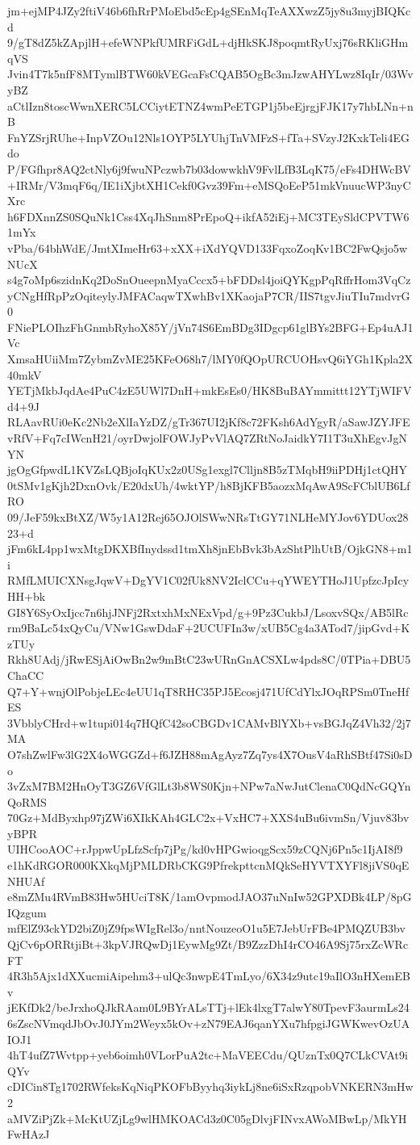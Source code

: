 jm+ejMP4JZy2ftiV46b6fhRrPMoEbd5cEp4gSEnMqTeAXXwzZ5jy8u3myjBIQKcd
9/gT8dZ5kZApjlH+efeWNPkfUMRFiGdL+djHkSKJ8poqmtRyUxj76sRKliGHmqVS
Jvin4T7k5nfF8MTymlBTW60kVEGcaFsCQAB5OgBc3mJzwAHYLwz8IqIr/03WvyBZ
aCtlIzn8toscWwnXERC5LCCiytETNZ4wmPeETGP1j5beEjrgjFJK17y7hbLNn+nB
FnYZSrjRUhe+InpVZOu12Nls1OYP5LYUhjTnVMFzS+fTa+SVzyJ2KxkTeli4EGdo
P/FGfhpr8AQ2ctNly6j9fwuNPczwb7b03dowwkhV9FvlLfB3LqK75/eFs4DHWcBV
+IRMr/V3mqF6q/IE1iXjbtXH1Cekf0Gvz39Fm+eMSQoEeP51mkVnuucWP3nyCXrc
h6FDXnnZS0SQuNk1Css4XqJhSnm8PrEpoQ+ikfA52iEj+MC3TEySldCPVTW61mYx
vPba/64bhWdE/JmtXImeHr63+xXX+iXdYQVD133FqxoZoqKv1BC2FwQsjo5wNUcX
s4g7oMp6szidnKq2DoSnOueepnMyaCccx5+bFDDsl4joiQYKgpPqRffrHom3VqCz
yCNgHfRpPzOqiteylyJMFACaqwTXwhBv1XKaojaP7CR/IIS7tgvJiuTIu7mdvrG0
FNiePLOIhzFhGnmbRyhoX85Y/jVn74S6EmBDg3IDgcp61glBYs2BFG+Ep4uAJ1Vc
XmsaHUiiMm7ZybmZvME25KFeO68h7/lMY0fQOpURCUOHsvQ6iYGh1Kpla2X40mkV
YETjMkbJqdAe4PuC4zE5UWl7DnH+mkEsEs0/HK8BuBAYmmittt12YTjWIFVd4+9J
RLAavRUi0eKc2Nb2eXlIaYzDZ/gTr367UI2jKf8c72FKsh6AdYgyR/aSawJZYJFE
vRfV+Fq7cIWcnH21/oyrDwjolFOWJyPvVlAQ7ZRtNoJaidkY7I1T3uXhEgvJgNYN
jgOgGfpwdL1KVZsLQBjoIqKUx2z0USg1exgl7Clljn8B5zTMqbH9iiPDHj1ctQHY
0tSMv1gKjh2DxnOvk/E20dxUh/4wktYP/h8BjKFB5aozxMqAwA9ScFCblUB6LfRO
09/JeF59kxBtXZ/W5y1A12Rej65OJOlSWwNRsTtGY71NLHeMYJov6YDUox2823+d
jFm6kL4pp1wxMtgDKXBfInydssd1tmXh8jnEbBvk3bAzShtPlhUtB/OjkGN8+m1i
RMfLMUICXNsgJqwV+DgYV1C02fUk8NV2IclCCu+qYWEYTHoJ1UpfzcJpIcyHH+bk
GI8Y6SyOxIjcc7n6hjJNFj2RxtxhMxNExVpd/g+9Pz3CukbJ/LsoxvSQx/AB5lRc
rm9BaLc54xQyCu/VNw1GswDdaF+2UCUFIn3w/xUB5Cg4a3ATod7/jipGvd+KzTUy
Rkh8UAdj/jRwESjAiOwBn2w9mBtC23wURnGnACSXLw4pds8C/0TPia+DBU5ChaCC
Q7+Y+wnjOlPobjeLEc4eUU1qT8RHC35PJ5Ecosj471UfCdYlxJOqRPSm0TneHfES
3VbblyCHrd+w1tupi014q7HQfC42soCBGDv1CAMvBlYXb+vsBGJqZ4Vh32/2j7MA
O7shZwlFw3lG2X4oWGGZd+f6JZH88mAgAyz7Zq7ys4X7OusV4aRhSBtf47Si0sDo
3vZxM7BM2HnOyT3GZ6VfGlLt3b8WS0Kjn+NPw7aNwJutClenaC0QdNcGQYnQoRMS
70Gz+MdByxhp97jZWi6XIkKAh4GLC2x+VxHC7+XXS4uBu6ivmSn/Vjuv83bvyBPR
UIHCooAOC+rJppwUpLfzScfp7jPg/kd0vHPGwioqgScx59zCQNj6Pn5c1IjAI8f9
e1hKdRGOR000KXkqMjPMLDRbCKG9PfrekpttcnMQkSeHYVTXYFl8jiVS0qENHUAf
e8mZMu4RVmB83Hw5HUciT8K/1amOvpmodJAO37uNnIw52GPXDBk4LP/8pGIQzgum
mfElZ93ckYD2biZ0jZ9fpsWIgRel3o/nntNouzeoO1u5E7JebUrFBe4PMQZUB3bv
QjCv6pORRtjiBt+3kpVJRQwDj1EywMg9Zt/B9ZzzDhI4rCO46A9Sj75rxZcWRcFT
4R3h5Ajx1dXXucmiAipehm3+ulQc3nwpE4TmLyo/6X34z9utc19aIlO3nHXemEBv
jEKfDk2/beJrxhoQJkRAam0L9BYrALsTTj+lEk4lxgT7alwY80TpevF3aurmLs24
6sZscNVmqdJbOvJ0JYm2Weyx5kOv+zN79EAJ6qanYXu7hfpgiJGWKwevOzUAIOJ1
4hT4ufZ7Wvtpp+yeb6oimh0VLorPuA2tc+MaVEECdu/QUznTx0Q7CLkCVAt9iQYv
cDICin8Tg1702RWfeksKqNiqPKOFbByyhq3iykLj8ne6iSxRzqpobVNKERN3mHw2
aMVZiPjZk+McKtUZjLg9wlHMKOACd3z0C05gDlvjFINvxAWoMBwLp/MkYHFwHAzJ
